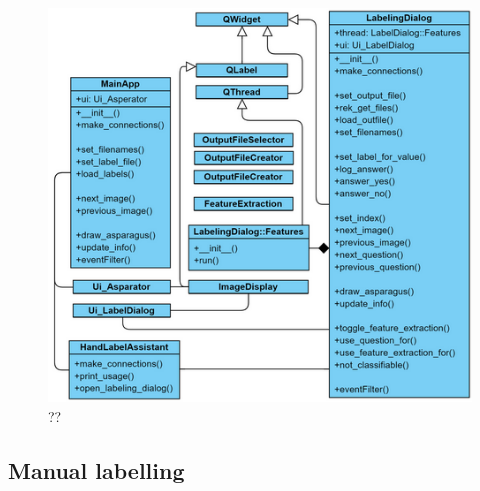 \begin{figure}[h]
	\centering
	\includegraphics[scale=0.6]{Figures/chapter03/label_app_tree}
	\decoRule
	\caption[??]{??}
	\label{fig:LabelAppTree}
\end{figure}



\subsection{Manual labelling}

